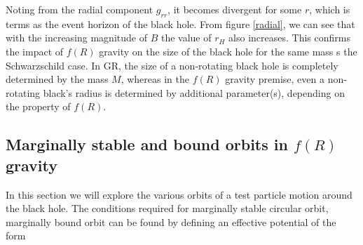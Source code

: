\documentclass[12pt,a4paper,oneside]{book}
\begin{document}
Noting from the radial component $g_{rr}$, it becomes divergent for some $r$, which is terms as the event horizon of the black hole. From figure \ref{radial}, we can see that with the increasing magnitude of $B$ the value of $r_H$ also increases. This confirms the impact of $f(R)$ gravity on the size of the black hole for the same mass s the Schwarzschild case. In GR, the size of a non-rotating black hole is completely determined by the mass $M$, whereas in the $f(R)$ gravity premise, even a non-rotating black's radius is determined by additional parameter(s), depending on the property of $f(R)$. 


\subsection{Marginally stable and bound orbits in $f(R)$ gravity}
In this section we will explore the various orbits of a test particle motion around the black hole. The conditions required for marginally stable circular orbit, marginally bound orbit can be found by defining an effective potential of the form
\end{document}
